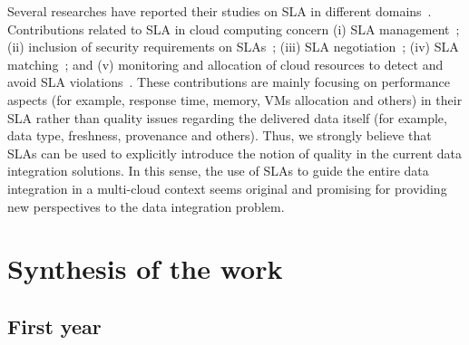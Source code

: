 Several researches have reported their studies on SLA in different domains~\cite{AlhamadDC11}.
Contributions related to SLA in cloud computing concern (i) SLA management~\cite{Mavrogeorgi2013}; 
(ii) inclusion of security requirements on SLAs~\cite{rak2013}; (iii) SLA negotiation~\cite{Falasi2016, Son2014}; (iv) SLA matching~\cite{Redl2012}; and (v) monitoring and allocation of cloud resources to detect and avoid SLA violations~\cite{Leitner2010}. 
These contributions are mainly focusing on performance aspects (for example, response time, memory, VMs allocation and others) in their SLA rather than quality issues regarding the delivered data itself (for example, data type, freshness, provenance and others).
Thus, we strongly believe that SLAs can be used  to explicitly introduce the notion of quality in the current data integration solutions. 
In this sense, the use of SLAs to guide the entire data integration in a multi-cloud context seems original and promising for providing new perspectives to the data integration problem.




\section{Synthesis of the work}
%
%
\subsection{First year}

